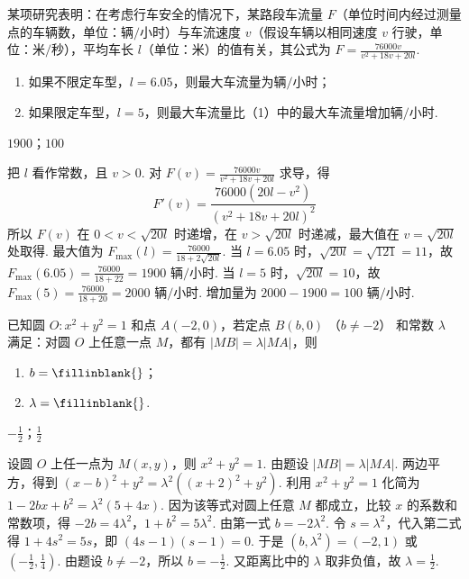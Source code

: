 \begin{problem}
某项研究表明：在考虑行车安全的情况下，某路段车流量 \(F\)（单位时间内经过测量点的车辆数，单位：\(\text{辆}/\text{小时}\)）与车流速度 \(v\)（假设车辆以相同速度 \(v\) 行驶，单位：\(\text{米}/\text{秒}\)），平均车长 \(l\)（单位：\(\text{米}\)）的值有关，其公式为 \(F = \frac{76000v}{v^2 + 18v + 20l}\).
\begin{enumerate}
    \item 如果不限定车型，\(l = 6.05\)，则最大车流量为\fillinblank{}\(\text{辆}/\text{小时}\)；
    \item 如果限定车型，\(l = 5\)，则最大车流量比（1）中的最大车流量增加\fillinblank{}\(\text{辆}/\text{小时}\).
\end{enumerate}
\end{problem}

\begin{answer}
\(1900\)；\(100\)
\end{answer}

\begin{solution}
把 \(l\) 看作常数，且 \(v>0\). 对 \(F(v)=\frac{76000v}{v^2+18v+20l}\) 求导，得
\[
F'(v)=\frac{76000(20l-v^2)}{(v^2+18v+20l)^2}
\]
所以 \(F(v)\) 在 \(0<v<\sqrt{20l}\) 时递增，在 \(v>\sqrt{20l}\) 时递减，最大值在 \(v=\sqrt{20l}\) 处取得. 最大值为 \(F_{\max}(l)=\frac{76000}{18+2\sqrt{20l}}\).
当 \(l=6.05\) 时，\(\sqrt{20l}=\sqrt{121}=11\)，故 \(F_{\max}(6.05)=\frac{76000}{18+22}=1900\text{ 辆}/\text{小时}\). 当 \(l=5\) 时，\(\sqrt{20l}=10\)，故 \(F_{\max}(5)=\frac{76000}{18+20}=2000\text{ 辆}/\text{小时}\).
增加量为 \(2000-1900=100\text{ 辆}/\text{小时}\).
\end{solution}

\begin{problem}
已知圆 \(O: x^{2} + y^{2} = 1\) 和点 \(A(-2,0)\)，若定点 \(B(b,0)\) （\(b \neq -2\)） 和常数 \(\lambda\) 满足：对圆 \(O\) 上任意一点 \(M\)，都有 \(|MB| = \lambda |MA|\)，则
\begin{enumerate}
\item \( b =\fillinblank{} \)；
\item \(\lambda =\fillinblank{} \).
\end{enumerate}
\end{problem}

\begin{answer}
\(-\frac{1}{2}\)；\(\frac{1}{2}\)
\end{answer}

\begin{solution}
设圆 \(O\) 上任一点为 \(M(x,y)\)，则 \(x^2+y^2=1\). 由题设 \(|MB|=\lambda|MA|\). 两边平方，得到 \((x-b)^2+y^2=\lambda^2\left((x+2)^2+y^2\right)\). 利用 \(x^2+y^2=1\) 化简为 \(1-2bx+b^2=\lambda^2(5+4x)\).
因为该等式对圆上任意 \(M\) 都成立，比较 \(x\) 的系数和常数项，得
\(-2b=4\lambda^2\)，\(1+b^2=5\lambda^2\).
由第一式 \(b=-2\lambda^2\). 令 \(s=\lambda^2\)，代入第二式得
\(1+4s^2=5s\)，即 \((4s-1)(s-1)=0\).
于是 \((b,\lambda^2)=(-2,1)\) 或 \((-\frac{1}{2},\frac{1}{4})\). 由题设 \(b\neq-2\)，所以 \(b=-\frac{1}{2}\). 又距离比中的 \(\lambda\) 取非负值，故 \(\lambda=\frac{1}{2}\).
\end{solution}

